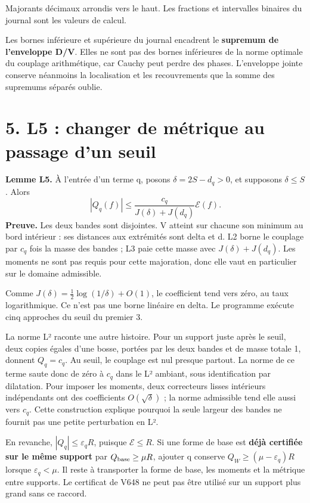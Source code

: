 \documentclass[
  10pt,
  a4paper,
]{article}
\begin{document}
Majorants décimaux arrondis vers le haut. Les fractions et intervalles
binaires du journal sont les valeurs de calcul.

Les bornes inférieure et supérieure du journal encadrent le
\textbf{supremum de l'enveloppe D/V}. Elles ne sont pas des bornes
inférieures de la norme optimale du couplage arithmétique, car Cauchy
peut perdre des phases. L'enveloppe jointe conserve néanmoins la
localisation et les recouvrements que la somme des supremums séparés
oublie.

\hypertarget{l5-changer-de-muxe9trique-au-passage-dun-seuil}{%
\section{5. L5 : changer de métrique au passage d'un
seuil}\label{l5-changer-de-muxe9trique-au-passage-dun-seuil}}

\textbf{Lemme L5.} À l'entrée d'un terme q, posons \(\delta=2S-d_q>0\),
et supposons \(\delta\le S\). Alors \[
|Q_q(f)|\le\frac{c_q}{J(\delta)+J(d_q)}\mathcal E(f).
\] \textbf{Preuve.} Les deux bandes sont disjointes. V atteint sur
chacune son minimum au bord intérieur : ses distances aux extrémités
sont delta et d. L2 borne le couplage par \(c_q\) fois la masse des
bandes ; L3 paie cette masse avec \(J(\delta)+J(d_q)\). Les moments ne
sont pas requis pour cette majoration, donc elle vaut en particulier sur
le domaine admissible.

Comme \(J(\delta)=\tfrac12\log(1/\delta)+O(1)\), le coefficient tend
vers zéro, au taux logarithmique. Ce n'est pas une borne linéaire en
delta. Le programme exécute cinq approches du seuil du premier 3.

La norme L² raconte une autre histoire. Pour un support juste après le
seuil, deux copies égales d'une bosse, portées par les deux bandes et de
masse totale 1, donnent \(Q_q=c_q\). Au seuil, le couplage est nul
presque partout. La norme de ce terme saute donc de zéro à \(c_q\) dans
le L² ambiant, sous identification par dilatation. Pour imposer les
moments, deux correcteurs lisses intérieurs indépendants ont des
coefficients \(O(\sqrt\delta)\) ; la norme admissible tend elle aussi
vers \(c_q\). Cette construction explique pourquoi la seule largeur des
bandes ne fournit pas une petite perturbation en L².

En revanche, \(|Q_q|\le\varepsilon_qR\), puisque \(\mathcal E\le R\). Si
une forme de base est \textbf{déjà certifiée sur le même support} par
\(Q_{\rm base}\ge\mu R\), ajouter q conserve
\(Q_W\ge(\mu-\varepsilon_q)R\) lorsque \(\varepsilon_q<\mu\). Il reste à
transporter la forme de base, les moments et la métrique entre supports.
Le certificat de V648 ne peut pas être utilisé sur un support plus grand
sans ce raccord.
\end{document}
